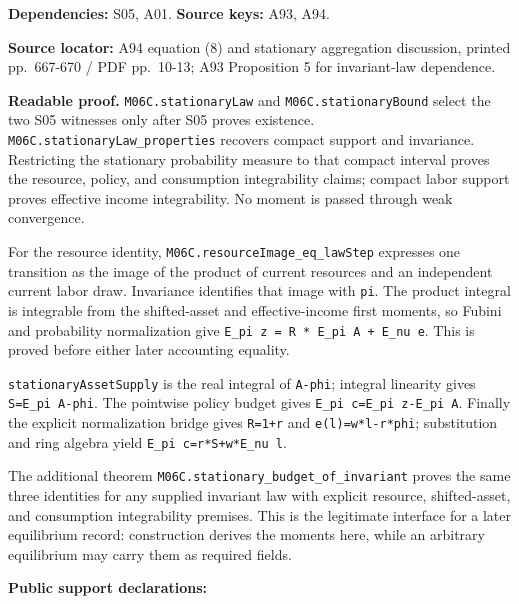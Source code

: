 \documentclass[
  11pt,
]{article}
\let\LedgerOriginalTexttt\texttt
\renewcommand{\texttt}[1]{{\small\LedgerOriginalTexttt{#1}}}
\begin{document}
\textbf{Dependencies:} S05, A01. \textbf{Source keys:} A93, A94.

\textbf{Source locator:} A94 equation (8) and stationary aggregation
discussion, printed pp.~667-670 / PDF pp.~10-13; A93 Proposition 5 for
invariant-law dependence.

\textbf{Readable proof.} \texttt{M06C.stationaryLaw} and
\texttt{M06C.stationaryBound} select the two S05 witnesses only after
S05 proves existence. \texttt{M06C.stationaryLaw\_properties} recovers
compact support and invariance. Restricting the stationary probability
measure to that compact interval proves the resource, policy, and
consumption integrability claims; compact labor support proves effective
income integrability. No moment is passed through weak convergence.

For the resource identity, \texttt{M06C.resourceImage\_eq\_lawStep}
expresses one transition as the image of the product of current
resources and an independent current labor draw. Invariance identifies
that image with \texttt{pi}. The product integral is integrable from the
shifted-asset and effective-income first moments, so Fubini and
probability normalization give
\texttt{E\_pi\ z\ =\ R\ *\ E\_pi\ A\ +\ E\_nu\ e}. This is proved before
either later accounting equality.

\texttt{stationaryAssetSupply} is the real integral of \texttt{A-phi};
integral linearity gives \texttt{S=E\_pi\ A-phi}. The pointwise policy
budget gives \texttt{E\_pi\ c=E\_pi\ z-E\_pi\ A}. Finally the explicit
normalization bridge gives \texttt{R=1+r} and \texttt{e(l)=w*l-r*phi};
substitution and ring algebra yield \texttt{E\_pi\ c=r*S+w*E\_nu\ l}.

The additional theorem \texttt{M06C.stationary\_budget\_of\_invariant}
proves the same three identities for any supplied invariant law with
explicit resource, shifted-asset, and consumption integrability
premises. This is the legitimate interface for a later equilibrium
record: construction derives the moments here, while an arbitrary
equilibrium may carry them as required fields.

\textbf{Public support declarations:}
\end{document}
